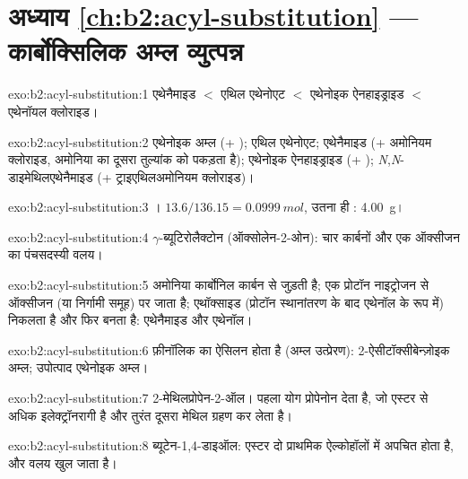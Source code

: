 \section*{अध्याय \ref{ch:b2:acyl-substitution} --- कार्बोक्सिलिक अम्ल व्युत्पन्न}

\begin{solution}{exo:b2:acyl-substitution:1}
एथेनैमाइड $<$ एथिल एथेनोएट $<$ एथेनोइक ऐनहाइड्राइड $<$ एथेनॉयल क्लोराइड।
\end{solution}

\begin{solution}{exo:b2:acyl-substitution:2}
एथेनोइक अम्ल (+ ); एथिल एथेनोएट; एथेनैमाइड (+ अमोनियम क्लोराइड, अमोनिया का दूसरा तुल्यांक
 को पकड़ता है); एथेनोइक ऐनहाइड्राइड (+ );
\textit{N},\textit{N}-डाइमेथिलएथेनैमाइड (+ ट्राइएथिलअमोनियम क्लोराइड)।
\end{solution}

\begin{solution}{exo:b2:acyl-substitution:3}
। $13.6/136.15 = \qty{0.0999}{mol}$, उतना ही
: \qty{4.00}{g}।
\end{solution}

\begin{solution}{exo:b2:acyl-substitution:4}
$\gamma$-ब्यूटिरोलैक्टोन (ऑक्सोलेन-2-ओन): चार कार्बनों और एक ऑक्सीजन का पंचसदस्यी वलय।
\end{solution}

\begin{solution}{exo:b2:acyl-substitution:5}
अमोनिया कार्बोनिल कार्बन से जुड़ती है; एक प्रोटॉन नाइट्रोजन से ऑक्सीजन (या
निर्गामी समूह) पर जाता है; एथॉक्साइड (प्रोटॉन स्थानांतरण के बाद एथेनॉल के रूप में) निकलता है और  फिर बनता है:
एथेनैमाइड और एथेनॉल।
\end{solution}

\begin{solution}{exo:b2:acyl-substitution:6}
फ़ीनॉलिक  का ऐसिलन होता है (अम्ल उत्प्रेरण): 2-ऐसीटॉक्सीबेन्ज़ोइक अम्ल; उपोत्पाद एथेनोइक अम्ल।
\end{solution}

\begin{solution}{exo:b2:acyl-substitution:7}
2-मेथिलप्रोपेन-2-ऑल। पहला योग प्रोपेनोन देता है, जो एस्टर से अधिक इलेक्ट्रॉनरागी है और
तुरंत दूसरा मेथिल ग्रहण कर लेता है।
\end{solution}

\begin{solution}{exo:b2:acyl-substitution:8}
ब्यूटेन-1,4-डाइऑल: एस्टर दो प्राथमिक ऐल्कोहॉलों में अपचित होता है, और वलय खुल जाता है।
\end{solution}

